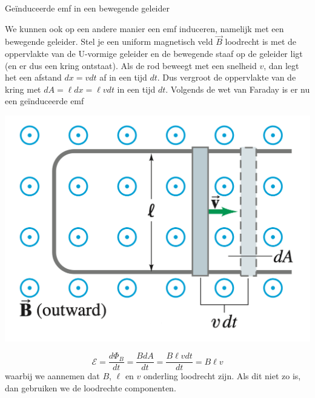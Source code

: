 \begin{app}{Geïnduceerde emf in een bewegende geleider}
    \begin{minipage}{.69\textwidth}
        We kunnen ook op een andere manier een emf induceren, namelijk met een bewegende geleider. Stel je een uniform magnetisch veld
        $\Vec{B}$ loodrecht is met de oppervlakte van de U-vormige geleider en de bewegende staaf op de geleider ligt (en er dus een kring 
        ontstaat). Als de rod beweegt met een snelheid $v$, dan legt het een afstand $dx = vdt$ af in een tijd $dt$.  Dus vergroot de oppervlakte
        van de kring met $dA = \ell dx = \ell v dt$ in een tijd $dt$. Volgends de wet van Faraday is er nu een geïnduceerde emf
    \end{minipage}
    \begin{minipage}{.27\textwidth}
        \includegraphics[scale = 0.23]{Images/Magnetisme/BewegendeGeleider}
    \end{minipage}
        \begin{equation*}
            \mathcal{E} = \dfrac{d\Phi_{B}}{dt} = \dfrac{BdA}{dt} = \dfrac{B\ell v dt}{dt} = B \ell v
        \end{equation*}
    waarbij we aannemen dat $B$, $\ell$ en $v$ onderling loodrecht zijn. Als dit niet zo is, dan gebruiken we de loodrechte componenten.
\end{app}

\newpage

